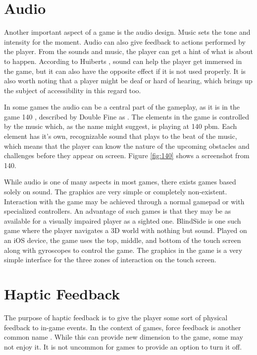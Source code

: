 

\section{Audio}
\label{immersionAudio}

Another important aspect of a game is the audio design.
Music sets the tone and intensity for the moment.
Audio can also give feedback to actions performed by the player.
From the sounds and music, the player can get a hint of what is about to happen.
According to Huiberts \cite{huiberts2010captivating}, sound can help the player get immersed in the game, but it can also have the opposite effect if it is not used properly.
It is also worth noting that a player might be deaf or hard of hearing, which brings up the subject of accessibility in this regard too.

In some games the audio can be a central part of the gameplay, as it is in the game 140 \cite{140game}, described by Double Fine as
.
The elements in the game is controlled by the music which, as the name might suggest, is playing at 140 pbm.
Each element has it's own, recognizable sound that plays to the beat of the music, which means that the player can know the nature of the upcoming obstacles and challenges before they appear on screen.
Figure \ref{fig:140} shows a screenshot from 140.

While audio is one of many aspects in most games, there exists games based solely on sound.
The graphics are very simple or completely non-existent.
Interaction with the game may be achieved through a normal gamepad or with specialized controllers.
An advantage of such games is that they may be as available for a visually impaired player as a sighted one.
BlindSide \cite{blindside} is one such game where the player navigates a 3D world with nothing but sound.
Played on an iOS device, the game uses the top, middle, and bottom of the touch screen along with gyroscopes to control the game.
The graphics in the game is a very simple interface for the three zones of interaction on the touch screen.

\section{Haptic Feedback}
\label{immersionHaptic}
The purpose of haptic feedback is to give the player some sort of physical feedback to in-game events.
In the context of games, force feedback is another common name \cite{cummings2007evolution}.
While this can provide new dimension to the game, some may not enjoy it.
It is not uncommon for games to provide an option to turn it off.

